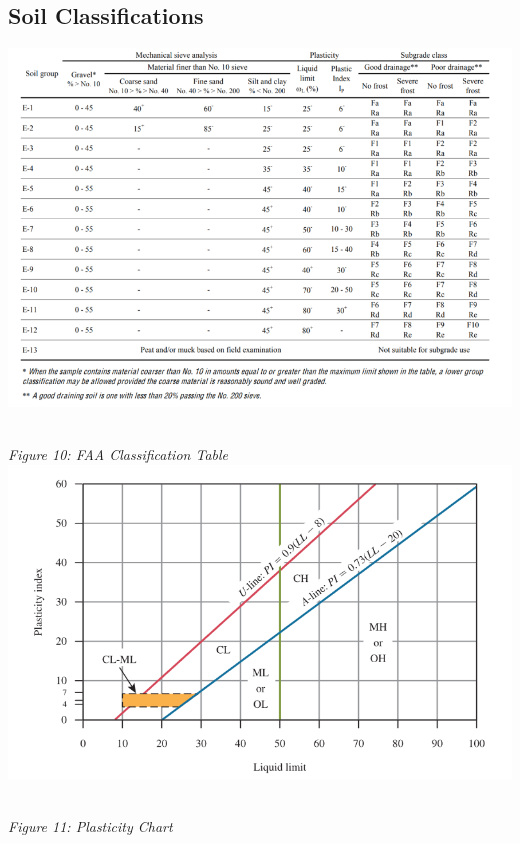 \documentclass{article}
\begin{document}
\subsection{Soil Classifications}
\begin{center}
\includegraphics*[scale=0.5]{fig1.png}
\emph{\\Figure 10: FAA Classification Table\\}
\vspace{5mm}
\includegraphics*[scale=0.5]{fig2.png}
\emph{\\Figure 11: Plasticity Chart\\}
\vspace{10mm}

\end{center}
\end{document}
